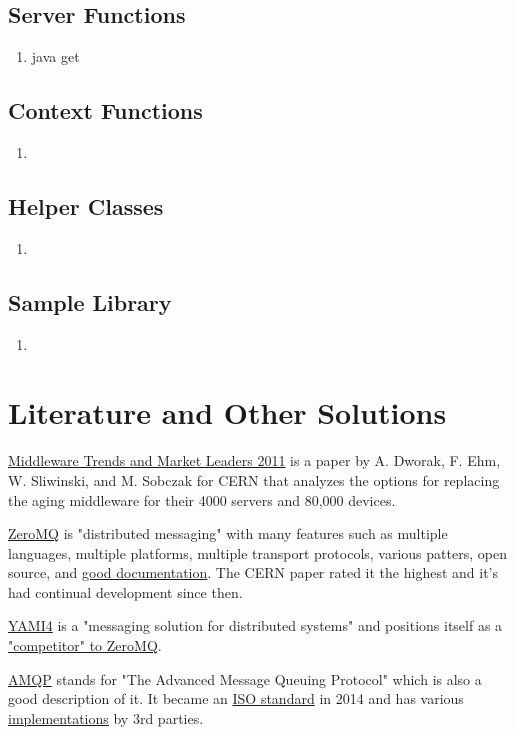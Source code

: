 \documentclass[twoside]{article}
\begin{document}
\subsection{Server Functions}
\begin{enumerate}
    \item java get
\end{enumerate}

\subsection{Context Functions}
\begin{enumerate}
    \item 
\end{enumerate}

\subsection{Helper Classes}
\begin{enumerate}
    \item 
\end{enumerate}

\subsection{Sample Library}
\begin{enumerate}
    \item 
\end{enumerate}



\section{Literature and Other Solutions}

\href{http://zeromq.wdfiles.com/local--files/intro\%3Aread-the-manual/Middleware\%20Trends\%20and\%20Market\%20Leaders\%202011.pdf}{Middleware Trends and Market Leaders 2011} is a paper by A. Dworak, F. Ehm, W. Sliwinski, and M. Sobczak for CERN that analyzes the options for replacing the aging middleware for their 4000 servers and 80,000 devices. 

\href{http://zeromq.org}{ZeroMQ} is "distributed messaging" with many features such as multiple languages, multiple platforms, multiple transport protocols, various patters, open source, and \href{http://zeromq.org/intro:read-the-manual}{good documentation}. The CERN paper rated it the highest and it's had continual development since then.

\href{http://www.inspirel.com/yami4/}{YAMI4} is a "messaging solution for distributed systems" and positions itself as a \href{http://www.inspirel.com/articles/YAMI4_vs_ZeroMQ.html}{"competitor" to ZeroMQ}.

\href{http://www.amqp.org/}{AMQP} stands for "The Advanced Message Queuing Protocol" which is also a good description of it. It became an \href{https://www.oasis-open.org/news/pr/iso-and-iec-approve-oasis-amqp-advanced-message-queuing-protocol}{ISO standard} in 2014 and has various \href{http://www.amqp.org/about/examples}{implementations} by 3rd parties. 
\end{document}
